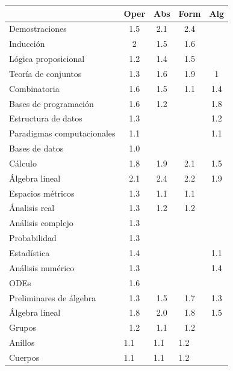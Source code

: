 \begin{refsection}
\begin{table}[H]
\begin{center}
\end{center}
\begin{center}
\begin{tabular}{|l|c|c|c|c|}
\hline
\rowcolor[HTML]{00C0F3} 
\multicolumn{1}{|c|}{\cellcolor[HTML]{00C0F3} \textbf{Contenidos}} & \textbf{Oper} & \textbf{Abs} & \textbf{Form} & \textbf{Alg} \\ \hline
Demostraciones & 1.5 & 2.1 & 2.4 &  \\ \hline
Inducción & 2 & 1.5 & 1.6 &  \\ \hline
Lógica proposicional & 1.2 & 1.4 & 1.5 &  \\ \hline
Teoría de conjuntos & 1.3 & 1.6 & 1.9 & 1 \\ \hline
Combinatoria & 1.6 & 1.5 & 1.1 & 1.4 \\ \hline
Bases de programación & 1.6 & 1.2 &  & 1.8 \\ \hline
Estructura de datos & 1.3 &  &  & 1.2 \\ \hline
Paradigmas computacionales & 1.1 &  &  & 1.1 \\ \hline
Bases de datos & 1.0 &  &  &  \\ \hline
Cálculo & 1.8 & 1.9 & 2.1 & 1.5 \\ \hline
Álgebra lineal & 2.1 & 2.4 & 2.2 & 1.9 \\ \hline
Espacios métricos & 1.3 & 1.1 & 1.1 &  \\ \hline
Ánalisis real & 1.3 & 1.2 & 1.2 &  \\ \hline
Análisis complejo & 1.3 &  &  &  \\ \hline
Probabilidad & 1.3 &  &  &  \\ \hline
Estadística & 1.4 &  &  & 1.1 \\ \hline
Análisis numérico & 1.3 &  &  & 1.4 \\ \hline
ODEs & 1.6 &  &  &  \\ \hline
Preliminares de álgebra & 1.3 & 1.5 & 1.7 & 1.3 \\ \hline
Álgebra lineal & 1.8 & 2.0 & 1.8 & 1.5 \\ \hline
Grupos & 1.2 & 1.1 & 1.2 &  \\ \hline
Anillos & \multicolumn{1}{l|}{1.1} & \multicolumn{1}{l|}{1.1} & \multicolumn{1}{l|}{1.2} & \multicolumn{1}{l|}{} \\ \hline
Cuerpos & \multicolumn{1}{l|}{1.1} & \multicolumn{1}{l|}{1.1} & \multicolumn{1}{l|}{1.2} & \multicolumn{1}{l|}{} \\ \hline

\end{tabular}
\end{center}
\end{table}
\end{refsection}
